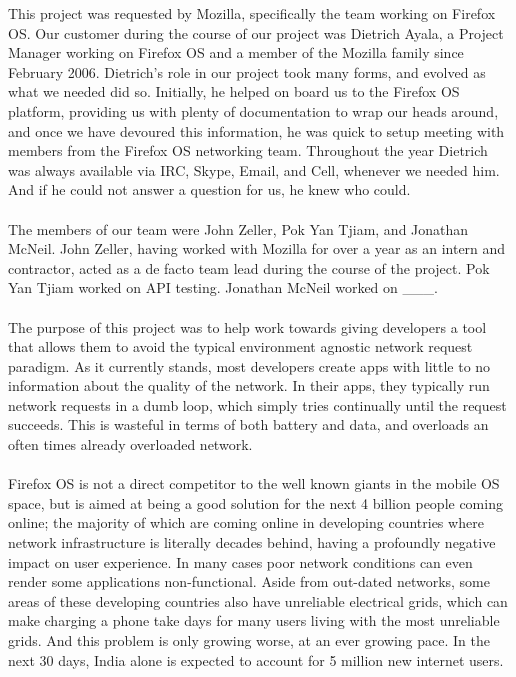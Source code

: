 \documentclass[12pt]{article}
\begin{document}
This project was requested by Mozilla, specifically the team working on Firefox OS. Our customer during the course of our project was Dietrich Ayala, a Project Manager working on Firefox OS and a member of the Mozilla family since February 2006. Dietrich's role in our project took many forms, and evolved as what we needed did so. Initially, he helped on board us to the Firefox OS platform, providing us with plenty of documentation to wrap our heads around, and once we have devoured this information, he was quick to setup meeting with members from the Firefox OS networking team. Throughout the year Dietrich was always available via IRC, Skype, Email, and Cell, whenever we needed him. And if he could not answer a question for us, he knew who could.
\\\\
The members of our team were John Zeller, Pok Yan Tjiam, and Jonathan McNeil. John Zeller, having worked with Mozilla for over a year as an intern and contractor, acted as a de facto team lead during the course of the project. Pok Yan Tjiam worked on API testing. Jonathan McNeil worked on \_\_\_.
\\\\
The purpose of this project was to help work towards giving developers a tool that allows them to avoid the typical environment agnostic network request paradigm. As it currently stands, most developers create apps with little to no information about the quality of the network. In their apps, they typically run network requests in a dumb loop, which simply tries continually until the request succeeds. This is wasteful in terms of both battery and data, and overloads an often times already overloaded network.
\\\\
Firefox OS is not a direct competitor to the well known giants in the mobile OS space, but is aimed at being a good solution for the next 4 billion people coming online; the majority of which are coming online in developing countries where network infrastructure is literally decades behind, having a profoundly negative impact on user experience. In many cases poor network conditions can even render some applications non-functional. Aside from out-dated networks, some areas of these developing countries also have unreliable electrical grids, which can make charging a phone take days for many users living with the most unreliable grids. And this problem is only growing worse, at an ever growing pace. In the next 30 days, India alone is expected to account for 5 million new internet users.
\pagebreak
\end{document}
